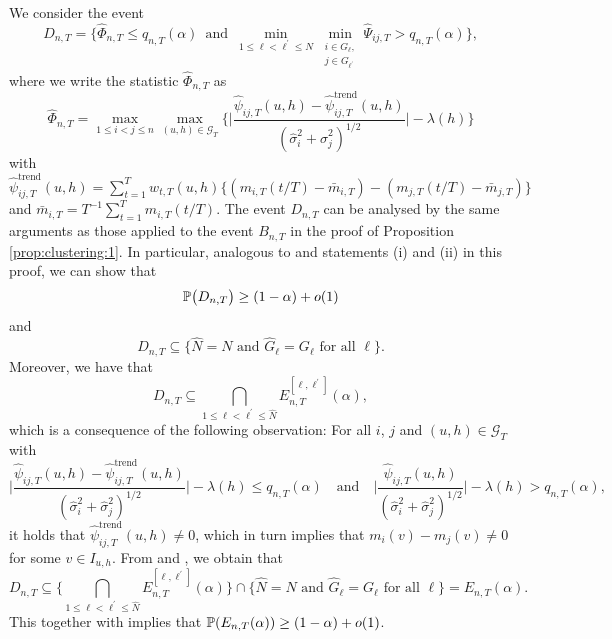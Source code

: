 \documentclass[12pt]{article}
\makeatletter
\renewcommand{\eqref}[1]{\tagform@{\ref{#1}}}
\makeatother
\begin{document}
We consider the event
\[ D_{n,T} = \Big\{ \widehat{\Phi}_{n,T} \le q_{n,T}(\alpha) \, \text{ and } \,  \min_{1 \le \ell < \ell^\prime \le N} \min_{\substack{i \in G_\ell, \\ j \in G_{\ell^\prime}}} \widehat{\Psi}_{ij,T} > q_{n,T}(\alpha) \Big\}, \]
where we write the statistic $\widehat{\Phi}_{n,T}$ as
\[ \widehat{\Phi}_{n,T} = \max_{1 \le i < j \le n} \max_{(u,h) \in \mathcal{G}_T} \Big\{ \Big| \frac{\widehat{\psi}_{ij,T}(u,h)- \widehat{\psi}_{ij,T}^{\text{trend}}(u,h)} {(\widehat{\sigma}_i^2 + \widehat{\sigma}_j^2)^{1/2}} \Big| - \lambda(h) \Big \} \]
with $\widehat{\psi}_{ij,T}^{\text{trend}}(u,h) = \sum_{t=1}^T w_{t,T}(u,h) \{ (m_{i,T}(t/T) - \bar{m}_{i,T}) - (m_{j,T}(t/T) - \bar{m}_{j,T}) \}$ and $\bar{m}_{i,T} = T^{-1} \sum_{t=1}^T m_{i,T}(t/T)$. The event $D_{n,T}$ can be analysed by the same arguments as those applied to the event $B_{n,T}$ in the proof of Proposition \ref{prop:clustering:1}. In particular, analogous to \eqref{eq2-prop-clustering-1} and statements (i) and (ii) in this proof, we can show that
\begin{equation}\label{eq1-prop-clustering-2}
\mathbb{P} \big( D_{n,T} \big) \ge (1-\alpha) + o(1)
\end{equation}
and 
\begin{equation}\label{eq2-prop-clustering-2}
D_{n,T} \subseteq \big\{ \widehat{N} = N \text{ and } \widehat{G}_\ell = G_\ell \text{ for all } \ell \big\}.
\end{equation}
Moreover, we have that
\begin{equation}\label{eq3-prop-clustering-2}
D_{n,T} \subseteq \bigcap_{1 \le \ell < \ell^\prime \le \widehat{N}} E_{n,T}^{[\ell,\ell^\prime]}(\alpha),
\end{equation}
which is a consequence of the following observation: For all $i$, $j$ and $(u,h) \in \mathcal{G}_T$ with 
\[ \Big|\frac{\widehat{\psi}_{ij,T}(u,h) - \widehat{\psi}_{ij,T}^{\text{trend}}(u,h)}{(\widehat{\sigma}_i^2 + \widehat{\sigma}_j^2)^{1/2}}\Big| - \lambda(h) \le q_{n,T}(\alpha) \quad \text{and} \quad \Big|\frac{\widehat{\psi}_{ij,T}(u,h)}{(\widehat{\sigma}_i^2 + \widehat{\sigma}_j^2)^{1/2}}\Big| - \lambda(h) > q_{n,T}(\alpha), \]
it holds that $\widehat{\psi}_{ij,T}^{\text{trend}}(u,h) \ne 0$, which in turn implies that $m_i(v) - m_j(v) \ne 0$ for some $v \in I_{u,h}$. From \eqref{eq2-prop-clustering-2} and \eqref{eq3-prop-clustering-2}, we obtain that 
\[ D_{n,T} \subseteq \Big\{ \bigcap_{1 \le \ell < \ell^\prime \le \widehat{N}} E_{n,T}^{[\ell,\ell^\prime]}(\alpha) \Big\} \cap \big\{ \widehat{N} = N \text{ and } \widehat{G}_\ell = G_\ell \text{ for all } \ell \big\} = E_{n,T}(\alpha). \] 
This together with \eqref{eq1-prop-clustering-2} implies that $\mathbb{P}(E_{n,T}(\alpha)) \ge (1-\alpha) + o(1)$. 



\bigskip
{}

{\small
\setlength{\bibsep}{0.6em}
}
\end{document}
